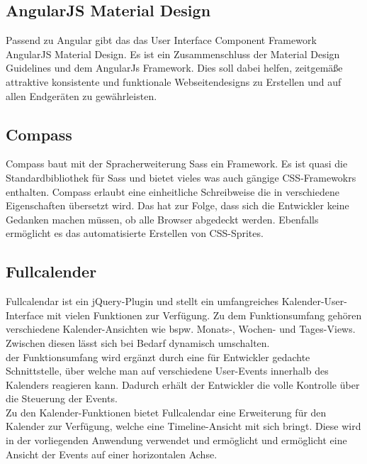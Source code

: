 \subsection{AngularJS Material Design}
Passend zu Angular gibt das das User Interface Component Framework AngularJS Material Design. Es ist ein Zusammenschluss der Material Design Guidelines und dem AngularJs Framework. Dies soll dabei helfen, zeitgemäße attraktive konsistente und funktionale  Webseitendesigns zu Erstellen und auf allen Endgeräten zu gewährleisten.

\subsection{Compass}
Compass baut mit der Spracherweiterung Sass ein Framework. Es ist quasi die Standardbibliothek für Sass und bietet vieles was auch gängige CSS-Framewokrs enthalten. Compass erlaubt eine einheitliche Schreibweise die in verschiedene Eigenschaften übersetzt wird. Das hat zur Folge, dass sich die Entwickler keine Gedanken machen müssen, ob alle Browser abgedeckt werden. Ebenfalls ermöglicht es das automatisierte Erstellen von CSS-Sprites. 

\subsection{Fullcalender}
Fullcalendar ist ein jQuery-Plugin und stellt ein umfangreiches Kalender-User-Interface mit vielen Funktionen zur Verfügung. Zu dem Funktionsumfang gehören verschiedene Kalender-Ansichten wie bspw. Monats-, Wochen- und Tages-Views. Zwischen diesen lässt sich bei Bedarf dynamisch umschalten.\\
der Funktionsumfang wird ergänzt durch eine für Entwickler gedachte Schnittstelle, über welche man auf verschiedene User-Events innerhalb des Kalenders reagieren kann. Dadurch erhält der Entwickler die volle Kontrolle über die Steuerung der Events.\\
Zu den Kalender-Funktionen bietet Fullcalendar eine Erweiterung für den Kalender zur Verfügung, welche eine Timeline-Ansicht mit sich bringt. Diese wird in der vorliegenden Anwendung verwendet und ermöglicht und ermöglicht eine Ansicht der Events auf einer horizontalen Achse.

